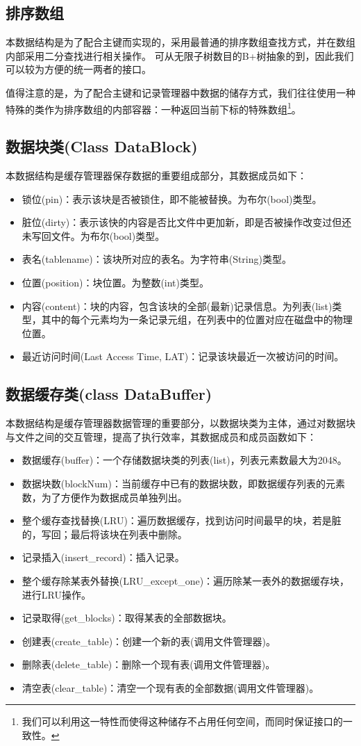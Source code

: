 \documentclass[UTF8]{ctexrep} %
\begin{document}
\subsection{排序数组}
本数据结构是为了配合主键而实现的，采用最普通的排序数组查找方式，并在数组内部采用二分查找进行相关操作。
可从无限子树数目的B+树抽象的到，因此我们可以较为方便的统一两者的接口。
\par
值得注意的是，为了配合主键和记录管理器中数据的储存方式，我们往往使用一种特殊的类作为排序数组的内部容器：一种返回当前下标的特殊数组\footnote{我们可以利用这一特性而使得这种储存不占用任何空间，而同时保证接口的一致性。}。

\subsection{数据块类(Class DataBlock)}
本数据结构是缓存管理器保存数据的重要组成部分，其数据成员如下：
\begin{itemize}
	\item 锁位(pin)：表示该块是否被锁住，即不能被替换。为布尔(bool)类型。
	\item 脏位(dirty)：表示该快的内容是否比文件中更加新，即是否被操作改变过但还未写回文件。为布尔(bool)类型。
	\item 表名(tablename)：该块所对应的表名。为字符串(String)类型。
	\item 位置(position)：块位置。为整数(int)类型。
	\item 内容(content)：块的内容，包含该块的全部(最新)记录信息。为列表(list)类型，其中的每个元素均为一条记录元组，在列表中的位置对应在磁盘中的物理位置。
	\item 最近访问时间(Last Access Time, LAT)：记录该块最近一次被访问的时间。
\end{itemize}

\subsection{数据缓存类(class DataBuffer)}
本数据结构是缓存管理器数据管理的重要部分，以数据块类为主体，通过对数据块与文件之间的交互管理，提高了执行效率，其数据成员和成员函数如下：
\begin{itemize}
	\item 数据缓存(buffer)：一个存储数据块类的列表(list)，列表元素数最大为2048。
	\item 数据块数(blockNum)：当前缓存中已有的数据块数，即数据缓存列表的元素数，为了方便作为数据成员单独列出。
	\item 整个缓存查找替换(LRU)：遍历数据缓存，找到访问时间最早的块，若是脏的，写回；最后将该块在列表中删除。
	\item 记录插入(insert\_record)：插入记录。
	\item 整个缓存除某表外替换(LRU\_except\_one)：遍历除某一表外的数据缓存块，进行LRU操作。
	\item 记录取得(get\_blocks)：取得某表的全部数据块。
	\item 创建表(create\_table)：创建一个新的表(调用文件管理器)。
	\item 删除表(delete\_table)：删除一个现有表(调用文件管理器)。
	\item 清空表(clear\_table)：清空一个现有表的全部数据(调用文件管理器)。
\end{itemize}
\end{document}

